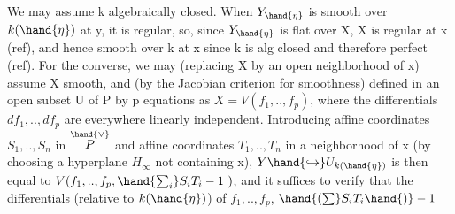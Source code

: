 We may assume k algebraically closed. When $Y_{\hand{\eta}}$ is smooth over $k(\hand{\eta})$
at y, it is regular, so, since $Y_{\hand{\eta}}$ is flat over X, X is regular
at x (ref), and hence smooth over k at x since k is alg closed and therefore
perfect (ref). For the converse, we may (replacing X by
an open neighborhood of x) assume X smooth, and (by the Jacobian criterion
for smoothness) defined in an open subset U of P by p equations
as $X=V(f_1,..,f_p)$, where the differentials $df_1,..,df_p$ are
everywhere linearly independent. Introducing affine coordinates
$S_1,..,S_n$ in $\overset{\hand{\vee}}{P}$ and affine coordinates $T_1,..,T_n$ in a neighborhood
of x (by choosing a hyperplane $H_\infty$ not containing x), $Y\hand{\hookrightarrow} U_{k(\hand{\eta})}$ is
then equal to $V(f_1,..,f_p,\hand{\sum_i}S_iT_i-1\ )$, and it suffices to verify that
the differentials (relative to $k(\hand{\eta})$) of $f_1,..,f_p$, $\hand{(\sum}S_iT_i\hand{)}-1$

